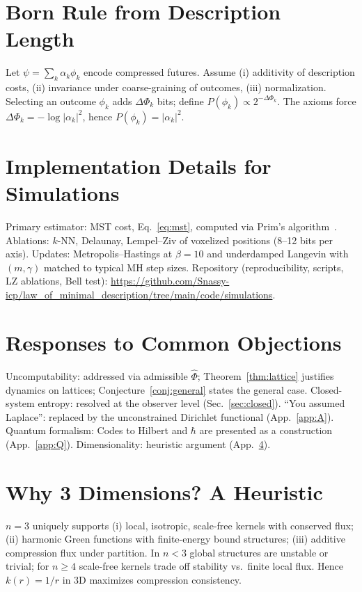 \documentclass[aps,preprint,onecolumn,longbibliography,nofootinbib]{revtex4-2}
\numberwithin{equation}{section}        %
\begin{document}
\section{Born Rule from Description Length}\label{app:B}
Let $\psi=\sum_k \alpha_k \phi_k$ encode compressed futures. Assume (i) additivity of description costs, (ii) invariance under coarse-graining of outcomes, (iii) normalization. Selecting an outcome $\phi_k$ adds $\Delta\Phi_k$ bits; define $P(\phi_k)\propto 2^{-\Delta\Phi_k}$. The axioms force $\Delta\Phi_k=-\log|\alpha_k|^2$, hence $P(\phi_k)=|\alpha_k|^2$.

\section{Implementation Details for Simulations}\label{app:C}
Primary estimator: MST cost, Eq.~\eqref{eq:mst}, computed via Prim's algorithm~\cite{Prim1957}. Ablations: $k$-NN, Delaunay, Lempel--Ziv of voxelized positions (8--12 bits per axis). Updates: Metropolis--Hastings at $\beta=10$ and underdamped Langevin with $(m,\gamma)$ matched to typical MH step sizes. Repository (reproducibility, scripts, LZ ablations, Bell test): \url{https://github.com/Snassy-icp/law_of_minimal_description/tree/main/code/simulations}.

\section{Responses to Common Objections}\label{app:D}
Uncomputability: addressed via admissible $\widehat\Phi$; Theorem~\ref{thm:lattice} justifies dynamics on lattices; Conjecture~\ref{conj:general} states the general case. Closed-system entropy: resolved at the observer level (Sec.~\ref{sec:closed}). ``You assumed Laplace'': replaced by the unconstrained Dirichlet functional (App.~\ref{app:A}). Quantum formalism: Codes to Hilbert and $\hbar$ are presented as a construction (App.~\ref{app:Q}). Dimensionality: heuristic argument (App.~\ref{app:E}).

\section{Why 3 Dimensions? A Heuristic}\label{app:E}
$n=3$ uniquely supports (i) local, isotropic, scale-free kernels with conserved flux; (ii) harmonic Green functions with finite-energy bound structures; (iii) additive compression flux under partition. In $n<3$ global structures are unstable or trivial; for $n\ge4$ scale-free kernels trade off stability vs.\ finite local flux. Hence $k(r)=1/r$ in $3$D maximizes compression consistency.
\end{document}
